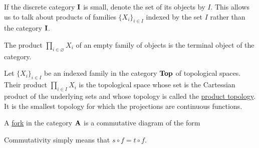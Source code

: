 \begin{note}\label{note:small_categorical_product}
  If the discrete category $\operatorname{\mathbf{I}}$ is small, denote the set of its objects by $I$. This allows us to talk about products of families $\{ X_i \}_{i \in I}$ indexed by the set $I$ rather than the category $\operatorname{\mathbf{I}}$.
\end{note}

\begin{note}\label{note:categorical_product_of_empty_family}
  The product $\prod_{i \in \varnothing} X_i$ of an empty family of objects is the terminal object of the category.
\end{note}

\begin{example}\label{categorical_product/top}
  Let $\{ X_i \}_{i \in I}$ be an indexed family in the category $\operatorname{\mathbf{Top}}$ of topological spaces. Their product $\prod_{i \in I} X_i$ is the topological space whose set is the Cartessian product of the underlying sets and whose topology is called the \uline{product topology}. It is the smallest topology for which the projections are continuous functions.
\end{example}

\begin{definition}\label{def:categorical_fork}\cite[112]{Leinster2014}
  A \uline{fork} in the category $\operatorname{\mathbf{A}}$ is a commutative diagram of the form
  \begin{center}
  \end{center}

  Commutativity simply means that $s \circ f = t \circ f$.
\end{definition}

